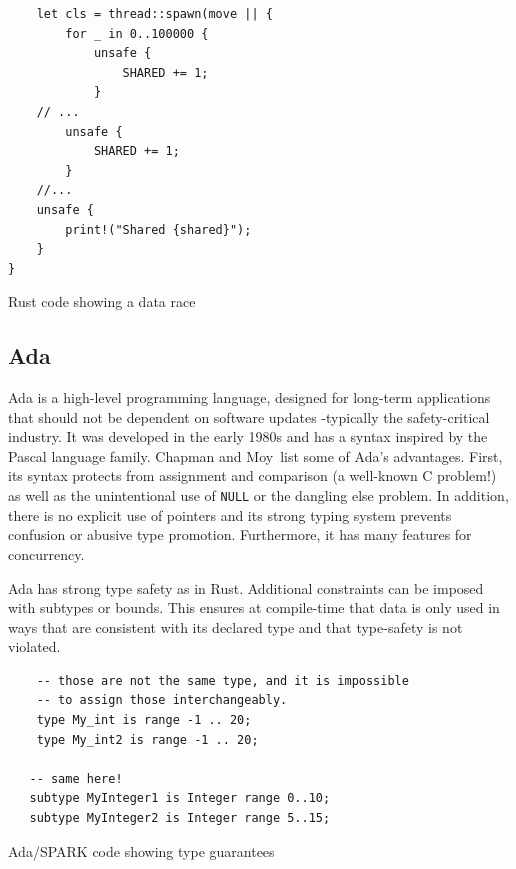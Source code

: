 \documentclass[nomenclature, english, bibtex]{kththesis}
\begin{document}
\begin{listing}[!ht]
\begin{verbatim}
    let cls = thread::spawn(move || {
        for _ in 0..100000 {
            unsafe {
                SHARED += 1;
            }
    // ...
        unsafe {
            SHARED += 1;
        }
    //...
    unsafe {
        print!("Shared {shared}");
    }
}
\end{verbatim}
\caption[Rust code showing a data race]{Rust code showing a data race }
\label{lstlisting:data_race2}
\end{listing}
\FloatBarrier



\subsection{Ada}

Ada is a high-level programming language, designed for long-term applications that should not be dependent on software updates -typically the safety-critical industry. It was developed in the early 1980s and has a syntax inspired by the Pascal language family.
Chapman and Moy\,\cite{chapman_adacore_2018} list some of Ada's advantages. First, its syntax protects from assignment and comparison (a well-known C problem!) as well as the unintentional use of \texttt{NULL} or the dangling else problem. In addition, there is no explicit use of pointers and its strong typing system prevents confusion or abusive type promotion. Furthermore, it has many features for concurrency.

Ada has strong type safety as in Rust. Additional constraints can be imposed with subtypes or bounds. This ensures at compile-time that data is only used in ways that are consistent with its declared type and that type-safety is not violated.

 \begin{listing}[!ht]
    \begin{verbatim}
    -- those are not the same type, and it is impossible
    -- to assign those interchangeably.
    type My_int is range -1 .. 20;
    type My_int2 is range -1 .. 20;
   
   -- same here!
   subtype MyInteger1 is Integer range 0..10;
   subtype MyInteger2 is Integer range 5..15;
\end{verbatim}
\caption[Ada/SPARK code showing type guarantees]{Ada/SPARK code showing type guarantees}
\label{lstlisting:spark_datatypes}
 \end{listing}
\end{document}
